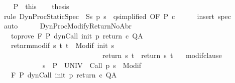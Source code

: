 \begin{isabellebody}
\isanewline
\ \ \isamarkupfalse%
\ P\ {\isacharequal}\ this\isanewline
\ \ \isamarkupfalse%
\ {\isacharquery}thesis\isanewline
\ \ \ \ \isamarkupfalse%
\ {\isacharminus}\isanewline
\ \ \ \ \isamarkupfalse%
\ {\isacharparenleft}rule\ DynProcStaticSpec\ {\isacharbrackleft}\ S{\isacharequal}{\isachardoublequoteopen}{\isacharbraceleft}s{\isachardot}\ p\ s\ {\isacharequal}\ q{\isacharbraceright}{\isachardoublequoteclose}{\isacharcomma}simplified{\isacharcomma}\ OF\ P\ c{\isacharbrackright}{\isacharparenright}\isanewline
\ \ \ \ \isamarkupfalse%
\ {\isacharparenleft}insert\ spec{\isacharparenright}\isanewline
\ \ \ \ \isamarkupfalse%
\ auto\isanewline
\ \ \ \ \isamarkupfalse%
\isanewline
{}\isamarkupfalse%
%
\endisatagproof
{\isafoldproof}%
%
\isadelimproof
\isanewline
%
\endisadelimproof
\isanewline
\isanewline
{}\isamarkupfalse%
\ DynProcModifyReturnNoAbr{\isacharcolon}\ \isanewline
\ \ \ to{\isacharunderscore}prove{\isacharcolon}\ {\isachardoublequoteopen}{\isasymGamma}{\isacharcomma}{\isasymTheta}{\isasymturnstile}\isactrlbsub {\isacharslash}F\isactrlesub \ P\ {\isacharparenleft}dynCall\ init\ p\ return{\isacharprime}\ c{\isacharparenright}\ Q{\isacharcomma}A{\isachardoublequoteclose}\isanewline
\ \ \ ret{\isacharunderscore}nrm{\isacharunderscore}modif{\isacharcolon}\ {\isachardoublequoteopen}{\isasymforall}s\ t{\isachardot}\ t\ {\isasymin}\ {\isacharparenleft}Modif\ {\isacharparenleft}init\ s{\isacharparenright}{\isacharparenright}\ \isanewline
\ \ \ \ \ \ \ \ \ \ \ \ \ \ \ \ \ \ \ \ \ \ \ \ \ \ \ \ {\isasymlongrightarrow}\ return{\isacharprime}\ s\ t\ {\isacharequal}\ return\ s\ t{\isachardoublequoteclose}\isanewline
\ \ \ modif{\isacharunderscore}clause{\isacharcolon}\ \isanewline
\ \ \ \ \ \ \ \ \ \ \ \ {\isachardoublequoteopen}{\isasymforall}s\ {\isasymin}\ P{\isachardot}\ {\isasymforall}{\isasymsigma}{\isachardot}\ {\isasymGamma}{\isacharcomma}{\isasymTheta}{\isasymturnstile}\isactrlbsub {\isacharslash}UNIV\isactrlesub \ {\isacharbraceleft}{\isasymsigma}{\isacharbraceright}\ Call\ {\isacharparenleft}p\ s{\isacharparenright}\ \ {\isacharparenleft}Modif\ {\isasymsigma}{\isacharparenright}{\isacharcomma}{\isacharbraceleft}{\isacharbraceright}{\isachardoublequoteclose}\isanewline
\ \ \ {\isachardoublequoteopen}{\isasymGamma}{\isacharcomma}{\isasymTheta}{\isasymturnstile}\isactrlbsub {\isacharslash}F\isactrlesub \ P\ {\isacharparenleft}dynCall\ init\ p\ return\ c{\isacharparenright}\ Q{\isacharcomma}A{\isachardoublequoteclose}\isanewline

\end{isabellebody}
